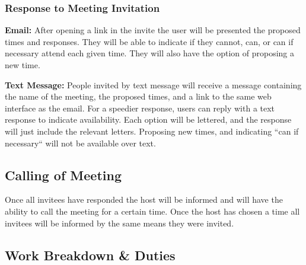 \documentclass{sigchi}
\begin{document}
\subsubsection{Response to Meeting Invitation}

\textbf{Email:}
After opening a link in the invite the user will be presented the proposed times and responses.
They will be able to indicate if they cannot, can, or can if necessary attend each given time.
They will also have the option of proposing a new time.

\textbf{Text Message:}
People invited by text message will receive a message containing the name of the meeting, 
the proposed times, and a link to the same web interface as the email.
For a speedier response, users can reply with a text response to indicate availability.
Each option will be lettered, and the response will just include the relevant letters.
Proposing new times, and indicating ``can if necessary`` will not be available over text.

\subsection{Calling of Meeting}
Once all invitees have responded the host will be informed 
and will have the ability to call the meeting for a certain time.
Once the host has chosen a time all invitees will be informed by the same means they were invited.


\subsection{Work Breakdown \& Duties}
\end{document}
